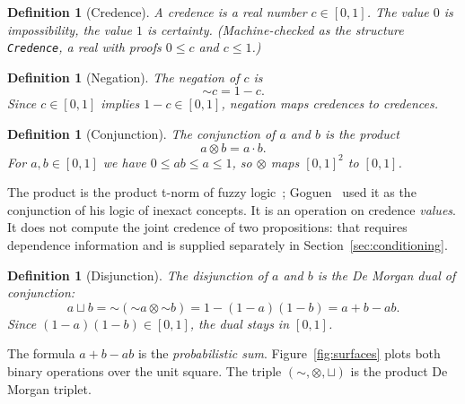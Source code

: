 \documentclass[11pt,a4paper]{article}
\newtheorem{definition}[theorem]{Definition}
\newcommand{\negc}{\mathord{\sim}}
\newcommand{\conjc}{\otimes}
\newcommand{\disjc}{\sqcup}
\begin{document}
\begin{definition}[Credence]
\label{def:credence}
A \emph{credence} is a real number $c \in [0,1]$.
The value $0$ is \emph{impossibility}, the value $1$ is
\emph{certainty}.
(Machine-checked as the structure \texttt{Credence}, a real with
proofs $0 \leq c$ and $c \leq 1$.)
\end{definition}

\begin{definition}[Negation]
\label{def:neg}
The \emph{negation} of $c$ is
\[
\negc c = 1 - c.
\]
Since $c \in [0,1]$ implies $1 - c \in [0,1]$, negation maps
credences to credences.
\end{definition}

\begin{definition}[Conjunction]
\label{def:conj}
The \emph{conjunction} of $a$ and $b$ is the product
\[
a \conjc b = a \cdot b.
\]
For $a, b \in [0,1]$ we have $0 \leq ab \leq a \leq 1$, so $\conjc$
maps $[0,1]^2$ to $[0,1]$.
\end{definition}

The product is the product t-norm of fuzzy
logic~\cite{klement2000,hajek1998}; Goguen~\cite{goguen1969} used it
as the conjunction of his logic of inexact concepts.
It is an operation on credence \emph{values}.
It does not compute the joint credence of two propositions: that
requires dependence information and is supplied separately in
Section~\ref{sec:conditioning}.

\begin{definition}[Disjunction]
\label{def:disj}
The \emph{disjunction} of $a$ and $b$ is the De Morgan dual of
conjunction:
\[
a \disjc b
  = \negc(\negc a \conjc \negc b)
  = 1 - (1-a)(1-b)
  = a + b - ab.
\]
Since $(1-a)(1-b) \in [0,1]$, the dual stays in $[0,1]$.
\end{definition}

The formula $a + b - ab$ is the \emph{probabilistic sum}.
Figure~\ref{fig:surfaces} plots both binary operations over the unit
square.
The triple $(\negc, \conjc, \disjc)$ is the product De Morgan
triplet.
\end{document}
